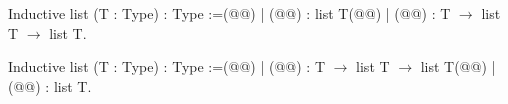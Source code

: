 Inductive list (T : Type) : Type :=(@\vspace{-0.04cm}@)
| (@@) : list T(@\vspace{-0.04cm}@)
| (@@) :  T $\rightarrow$ list T $\rightarrow$ list T.

Inductive list (T : Type) : Type :=(@\vspace{-0.04cm}@)
| (@@) : T $\rightarrow$ list T $\rightarrow$ list T(@\vspace{-0.04cm}@)
| (@@) : list T.


